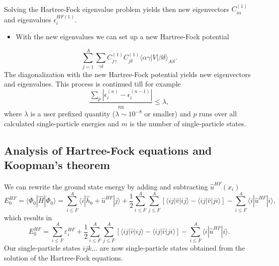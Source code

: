 \documentclass[%
twoside,                 %
final,                   %
10pt]{article}
\begin{document}
\paragraph{}
Solving the Hartree-Fock eigenvalue problem yields then new eigenvectors $C_{i\alpha}^{(1)}$ and eigenvalues
$\epsilon_i^{HF(1)}$. 
\begin{itemize}
 \item With the new eigenvalues we can set up a new Hartree-Fock potential 
\end{itemize}

\noindent
\[
\sum_{j = 1}^A\sum_{\gamma\delta} C_{j\gamma}^{(1)}C_{j\delta}^{(1)}\langle \alpha\gamma|V|\beta\delta\rangle_{AS}.
\]
The diagonalization with the new Hartree-Fock potential yields new eigenvectors and eigenvalues.
This process is continued till for example
\[
\frac{\sum_{p} |\epsilon_i^{(n)}-\epsilon_i^{(n-1)}|}{m} \le \lambda,  
\]
where $\lambda$ is a user prefixed quantity ($\lambda \sim 10^{-8}$ or smaller) and $p$ runs over all calculated single-particle
energies and $m$ is the number of single-particle states.



\subsection*{Analysis of Hartree-Fock equations and Koopman's theorem}

\paragraph{}
We can rewrite the ground state energy by adding and subtracting $\hat{u}^{HF}(x_i)$ 
\[
  E_0^{HF} =\langle \Phi_0 | \hat{H} | \Phi_0\rangle = 
\sum_{i\le F}^A \langle i | \hat{h}_0 +\hat{u}^{HF}| j\rangle+ \frac{1}{2}\sum_{i\le F}^A\sum_{j \le F}^A\left[\langle ij |\hat{v}|ij \rangle-\langle ij|\hat{v}|ji\rangle\right]-\sum_{i\le F}^A \langle i |\hat{u}^{HF}| i\rangle,
\]
which results in
\[
  E_0^{HF}
  = \sum_{i\le F}^A \varepsilon_i^{HF} + \frac{1}{2}\sum_{i\le F}^A\sum_{j \le F}^A\left[\langle ij |\hat{v}|ij \rangle-\langle ij|\hat{v}|ji\rangle\right]-\sum_{i\le F}^A \langle i |\hat{u}^{HF}| i\rangle.
\]
Our single-particle states $ijk\dots$ are now single-particle states obtained from the solution of the Hartree-Fock equations.



\end{document}
